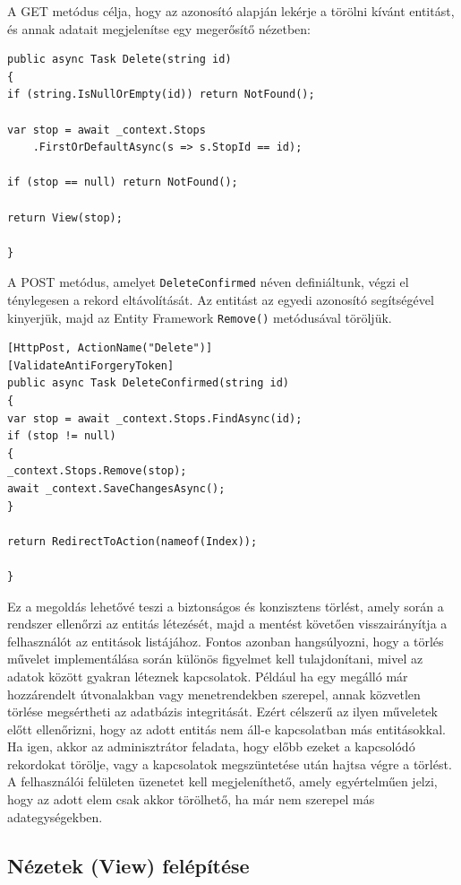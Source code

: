 A GET metódus célja, hogy az azonosító alapján lekérje a törölni kívánt entitást, és annak adatait megjelenítse egy megerősítő nézetben:

\begin{lstlisting}
public async Task Delete(string id)
{
if (string.IsNullOrEmpty(id)) return NotFound();

var stop = await _context.Stops
    .FirstOrDefaultAsync(s => s.StopId == id);

if (stop == null) return NotFound();

return View(stop);

}
\end{lstlisting}

A POST metódus, amelyet \texttt{DeleteConfirmed} néven definiáltunk, végzi el ténylegesen a rekord eltávolítását. Az entitást az egyedi azonosító segítségével kinyerjük, majd az Entity Framework \texttt{Remove()} metódusával töröljük.

\begin{lstlisting}
[HttpPost, ActionName("Delete")]
[ValidateAntiForgeryToken]
public async Task DeleteConfirmed(string id)
{
var stop = await _context.Stops.FindAsync(id);
if (stop != null)
{
_context.Stops.Remove(stop);
await _context.SaveChangesAsync();
}

return RedirectToAction(nameof(Index));

}
\end{lstlisting}

Ez a megoldás lehetővé teszi a biztonságos és konzisztens törlést, amely során a rendszer ellenőrzi az entitás létezését, majd a mentést követően visszairányítja a felhasználót az entitások listájához. Fontos azonban hangsúlyozni, hogy a törlés művelet implementálása során különös figyelmet kell tulajdonítani, mivel az adatok között gyakran léteznek kapcsolatok. Például ha egy megálló már hozzárendelt útvonalakban vagy menetrendekben szerepel, annak közvetlen törlése megsértheti az adatbázis integritását. Ezért célszerű az ilyen műveletek előtt ellenőrizni, hogy az adott entitás nem áll-e kapcsolatban más entitásokkal. Ha igen, akkor az adminisztrátor feladata, hogy előbb ezeket a kapcsolódó rekordokat törölje, vagy a kapcsolatok megszüntetése után hajtsa végre a törlést. A felhasználói felületen üzenetet kell megjeleníthető, amely egyértelműen jelzi, hogy az adott elem csak akkor törölhető, ha már nem szerepel más adategységekben.

\subsection{Nézetek (View) felépítése}

